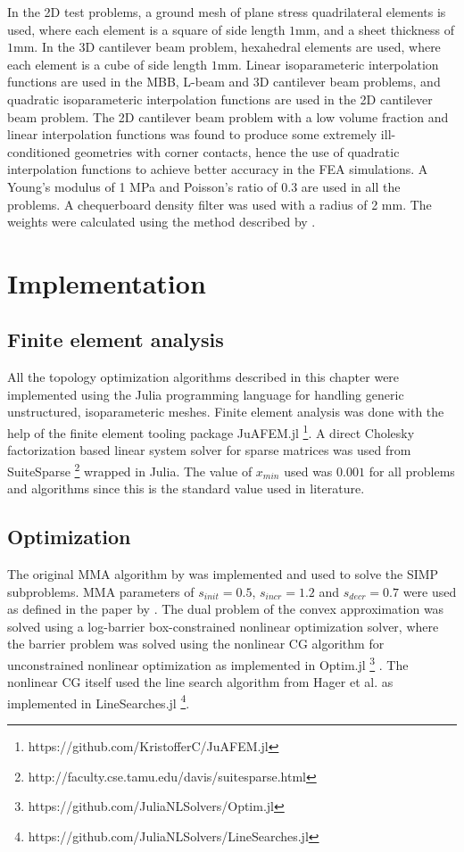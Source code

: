   In the 2D test problems, a ground mesh of plane stress quadrilateral elements is used, where each element is a square of side length $1\text{mm}$, and a sheet thickness of $1 \text{mm}$. In the 3D cantilever beam problem, hexahedral elements are used, where each element is a cube of side length $1\text{mm}$. Linear isoparameteric interpolation functions are used in the MBB, L-beam and 3D cantilever beam problems, and quadratic isoparameteric interpolation functions are used in the 2D cantilever beam problem. The 2D cantilever beam problem with a low volume fraction and linear interpolation functions was found to produce some extremely ill-conditioned geometries with corner contacts, hence the use of quadratic interpolation functions to achieve better accuracy in the FEA simulations. A Young's modulus of 1 MPa and Poisson's ratio of 0.3 are used in all the problems. A chequerboard density filter was used with a radius of 2 mm. The weights were calculated using the method described by \cite{Huang2010a}.

\section{Implementation} \label{sec:implementation}

  \subsection{Finite element analysis}

  All the topology optimization algorithms described in this chapter were implemented using the Julia programming language \citep{Bezanson2014} for handling generic unstructured, isoparameteric meshes. Finite element analysis was done with the help of the finite element tooling package JuAFEM.jl \footnote{https://github.com/KristofferC/JuAFEM.jl}. A direct Cholesky factorization based linear system solver for sparse matrices was used from SuiteSparse \footnote{http://faculty.cse.tamu.edu/davis/suitesparse.html} wrapped in Julia. The value of $x_{min}$ used was $0.001$ for all problems and algorithms since this is the standard value used in literature.

  \subsection{Optimization}

  The original MMA algorithm by \cite{Svanberg1987} was implemented and used to solve the SIMP subproblems. MMA parameters of $s_{init} = 0.5$, $s_{incr} = 1.2$ and $s_{decr} = 0.7$ were used as defined in the paper by \cite{Svanberg1987}. The dual problem of the convex approximation was solved using a log-barrier box-constrained nonlinear optimization solver, where the barrier problem was solved using the nonlinear CG algorithm for unconstrained nonlinear optimization \citep{Nocedal2006} as implemented in Optim.jl \footnote{https://github.com/JuliaNLSolvers/Optim.jl} \citep{KMogensen2018}. The nonlinear CG itself used the line search algorithm from Hager et al. \cite{Hager2006} as implemented in LineSearches.jl \footnote{https://github.com/JuliaNLSolvers/LineSearches.jl}.

